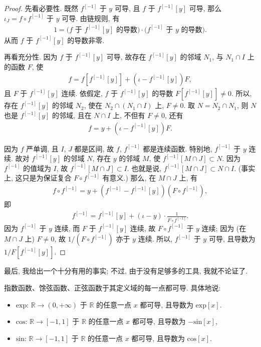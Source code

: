 \begin{proof}
    先看必要性. 既然 $f^{[-1]}$ 于 $y$ 可导, 且 $f$ 于 $f^{[-1]} [y]$ 可导, 那么 $\iota_J = f \circ f^{[-1]}$ 于 $y$ 可导. 由链规则, 有
    \begin{align*}
        1 = \text{($f$ 于 $f^{[-1]} [y]$ 的导数)} \cdot \text{($f^{[-1]}$ 于 $y$ 的导数)}.
    \end{align*}
    从而 $f$ 于 $f^{[-1]} [y]$ 的导数非零.

    再看充分性. 因为 $f$ 于 $f^{[-1]} [y]$ 可导, 故存在 $f^{[-1]} [y]$ 的邻域 $N_1$, 与 $N_1 \cap I$ 上的函数 $F$, 使
    \begin{align*}
        f = f[f^{[-1]} [y]] + (\iota - f^{[-1]} [y])F,
    \end{align*}
    且 $F$ 于 $f^{[-1]} [y]$ 连续. 依假定, $f$ 于 $f^{[-1]} [y]$ 的导数 $F[f^{[-1]} [y]] \neq 0$. 所以, 存在 $f^{[-1]} [y]$ 的邻域 $N_2$, 使在 $N_2 \cap (N_1 \cap I)$ 上, $F \neq 0$. 取 $N = N_2 \cap N_1$, 则 $N$ 也是 $f^{[-1]} [y]$ 的邻域, 且在 $N \cap I$ 上, 不但有 $F \neq 0$, 还有
    \begin{align*}
        f = y + (\iota - f^{[-1]} [y])F.
    \end{align*}

    因为 $f$ 严单调, 且 $I$, $J$ 都是区间, 故 $f$, $f^{[-1]}$ 都是连续函数. 特别地, $f^{[-1]}$ 于 $y$ 连续. 故对 $f^{[-1]} [y]$ 的邻域 $N$, 存在 $y$ 的邻域 $M$, 使 $f^{[-1]} [M \cap J] \subset N$. 因为 $f^{[-1]}$ 的值域为 $I$, 故 $f^{[-1]} [M \cap J] \subset I$. 也就是说, $f^{[-1]} [M \cap J] \subset N \cap I$. (事实上, 这只是为保证复合 $F \circ f^{[-1]}$ 有意义.) 那么, 在 $M \cap J$ 上, 有
    \begin{align*}
        f \circ f^{[-1]} = y + (f^{[-1]} - f^{[-1]} [y]) (F \circ f^{[-1]}),
    \end{align*}
    即
    \begin{align*}
        f^{[-1]} = f^{[-1]} [y] + (\iota - y) \cdot \frac{1}{F \circ f^{[-1]}}.
    \end{align*}
    因为 $f^{[-1]}$ 于 $y$ 连续, 而 $F$ 于 $f^{[-1]} [y]$ 连续, 故 $F \circ f^{[-1]}$ 于 $y$ 连续; 因为 (在 $M \cap J$ 上) $F \neq 0$, 故 $1/(F \circ f^{[-1]})$ 亦于 $y$ 连续. 所以, $f^{[-1]}$ 于 $y$ 可导, 且导数为 $1/F[f^{[-1]} [y]]$.
\end{proof}

最后, 我给出一个十分有用的事实; 不过, 由于没有足够多的工具, 我就不论证了.

\begin{theorem}
    指数函数、馀弦函数、正弦函数于其定义域的每一点都可导. 具体地说:
    \begin{itemize}
        \item $\mathrm{exp}$: $\mathbb{R} \to (0, +\infty)$ 于 $\mathbb{R}$ 的任意一点 $x$ 都可导, 且导数为 $\mathrm{exp} [x]$.
        \item $\mathrm{cos}$: $\mathbb{R} \to [-1, 1]$ 于 $\mathbb{R}$ 的任意一点 $x$ 都可导, 且导数为 $-\mathrm{sin} [x]$,
        \item $\mathrm{sin}$: $\mathbb{R} \to [-1, 1]$ 于 $\mathbb{R}$ 的任意一点 $x$ 都可导, 且导数为 $\mathrm{cos} [x]$.
    \end{itemize}
\end{theorem}

